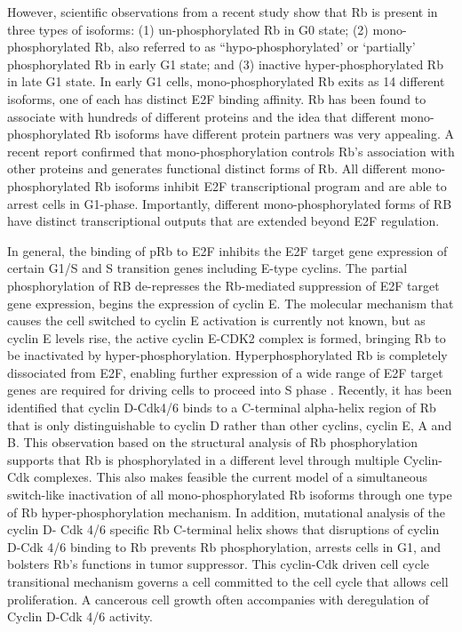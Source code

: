 However, scientific observations from a recent study show that Rb is present in three types of isoforms: (1) un-phosphorylated Rb in G0 state; (2) mono-phosphorylated Rb, also referred to as ``hypo-phosphorylated' or `partially' phosphorylated Rb in early G1 state; and (3) inactive hyper-phosphorylated Rb in late G1 state. In early G1 cells, mono-phosphorylated Rb exits as 14 different isoforms, one of each has distinct E2F binding affinity. Rb has been found to associate with hundreds of different proteins and the idea that different mono-phosphorylated Rb isoforms have different protein partners was very appealing. A recent report confirmed that mono-phosphorylation controls Rb's association with other proteins and generates functional distinct forms of Rb. All different mono-phosphorylated Rb isoforms inhibit E2F transcriptional program and are able to arrest cells in G1-phase. Importantly, different mono-phosphorylated forms of RB have distinct transcriptional outputs that are extended beyond E2F regulation.

In general, the binding of pRb to E2F inhibits the E2F target gene expression of certain G1/S and S transition genes including E-type cyclins. The partial phosphorylation of RB de-represses the Rb-mediated suppression of E2F target gene expression, begins the expression of cyclin E. The molecular mechanism that causes the cell switched to cyclin E activation is currently not known, but as cyclin E levels rise, the active cyclin E-CDK2 complex is formed, bringing Rb to be inactivated by hyper-phosphorylation. Hyperphosphorylated Rb is completely dissociated from E2F, enabling further expression of a wide range of E2F target genes are required for driving cells to proceed into S phase . Recently, it has been identified that cyclin D-Cdk4/6 binds to a C-terminal alpha-helix region of Rb that is only distinguishable to cyclin D rather than other cyclins, cyclin E, A and B. This observation based on the structural analysis of Rb phosphorylation supports that Rb is phosphorylated in a different level through multiple Cyclin-Cdk complexes. This also makes feasible the current model of a simultaneous switch-like inactivation of all mono-phosphorylated Rb isoforms through one type of Rb hyper-phosphorylation mechanism. In addition, mutational analysis of the cyclin D- Cdk 4/6 specific Rb C-terminal helix shows that disruptions of cyclin D-Cdk 4/6 binding to Rb prevents Rb phosphorylation, arrests cells in G1, and bolsters Rb's functions in tumor suppressor. This cyclin-Cdk driven cell cycle transitional mechanism governs a cell committed to the cell cycle that allows cell proliferation. A cancerous cell growth often accompanies with deregulation of Cyclin D-Cdk 4/6 activity.

